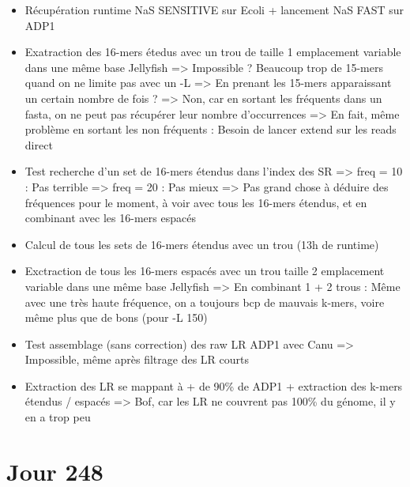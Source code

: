 \documentclass[12pt]{report}
\begin{document}
\begin{itemize}
	\item Récupération runtime NaS SENSITIVE sur Ecoli + lancement NaS FAST sur ADP1
	
	\item Exatraction des 16-mers étedus avec un trou de taille 1 emplacement variable dans une même base Jellyfish
		  => Impossible ? Beaucoup trop de 15-mers quand on ne limite pas avec un -L
		  => En prenant les 15-mers apparaissant un certain nombre de fois ? => Non, car en sortant les fréquents
		  	 dans un fasta, on ne peut pas récupérer leur nombre d'occurrences
		  => En fait, même problème en sortant les non fréquents : Besoin de lancer extend sur les reads direct
	
	\item Test recherche d'un set de 16-mers étendus dans l'index des SR
		  => freq = 10 : Pas terrible 
		  => freq = 20 : Pas mieux
		  => Pas grand chose à déduire des fréquences pour le moment, à voir avec tous les 16-mers étendus,
		  	 et en combinant avec les 16-mers espacés
		  
	\item Calcul de tous les sets de 16-mers étendus avec un trou (13h de runtime)
			
	\item Exctraction de tous les 16-mers espacés avec un trou taille 2 emplacement variable dans une même base Jellyfish
		  => En combinant 1 + 2 trous : Même avec une très haute fréquence, on a toujours bcp de mauvais k-mers,
		  	 voire même plus que de bons (pour -L 150)
		  	 
	\item Test assemblage (sans correction) des raw LR ADP1 avec Canu
		  => Impossible, même après filtrage des LR courts
	
	\item Extraction des LR se mappant à + de 90\% de ADP1 + extraction des k-mers étendus / espacés
		  => Bof, car les LR ne couvrent pas 100\% du génome, il y en a trop peu
\end{itemize}

\section{Jour 248}
\end{document}
